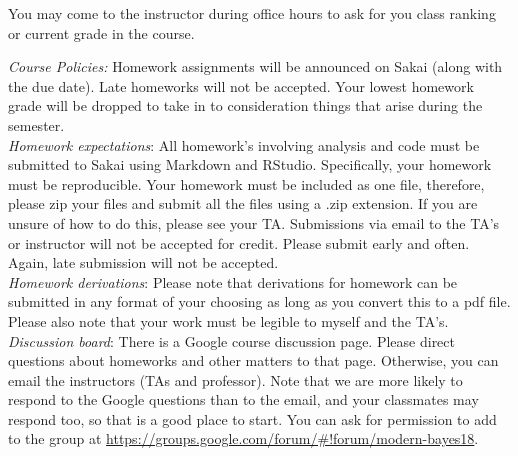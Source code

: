 \documentclass[11pt]{article}
\begin{document}
You may come to the instructor during office hours to ask for you class ranking or current grade in the course. 

\emph{Course Policies:} 
Homework assignments will be announced on Sakai (along with the due date). Late homeworks will not be accepted. Your lowest homework grade will be dropped to take in to consideration things that arise during the semester. \\

\emph{Homework expectations}: All homework's involving analysis and code must be submitted to Sakai using Markdown and RStudio. Specifically, your homework must be reproducible. Your homework must be included as one file, therefore, please zip your files and submit all the files using a .zip extension. If you are unsure of how to do this, please see your TA. Submissions via email to the TA's or instructor will not be accepted for credit. Please submit early and often. Again, late submission will not be accepted. \\

\emph{Homework derivations}: Please note that derivations for homework can be submitted in any format of your choosing as long as you convert this to a pdf file. Please also note that your work must be legible to myself and the TA's. \\


\emph{Discussion board}:
There is a Google course discussion page. Please direct questions about homeworks and other matters to that page. Otherwise, you can email the instructors (TAs and professor). Note that we are more likely to respond to the Google questions than to the email, and your classmates may respond too, so that is a good place to start. You can ask for permission to add to the group at \url{https://groups.google.com/forum/#!forum/modern-bayes18}.\\
\end{document}

